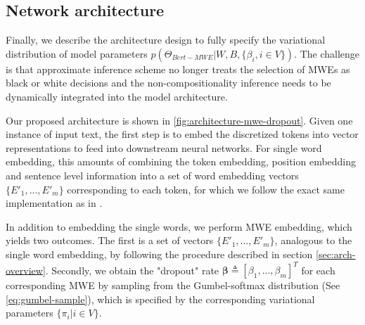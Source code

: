 \subsection{Network architecture}
Finally, we describe the architecture design to fully specify the  variational distribution of model parameters $p(\Theta_{Bert-MWE} \vert W, B, \{\beta_i, i \in V\})$. 
The challenge is that approximate inference scheme no longer treats the selection of MWEs as black or white decisions and the non-compositionality inference needs to be dynamically integrated into the model architecture. 




Our proposed architecture is shown in \autoref{fig:architecture-mwe-dropout}. 
Given one instance of input text, the first step is to embed the discretized tokens into vector representations to feed into downstream neural networks.
For single word embedding, this amounts of combining the token embedding, position embedding and sentence level information into 
a set of word embedding vectors $\{E'_1, ..., E'_m\}$ corresponding to each token, for which we follow the exact same implementation as in \cite{devlin2018bert}.

In addition to embedding the single words, 
we perform MWE embedding, which yields two outcomes.
The first is a set of vectors $\{E'_1, ..., E'_m\}$, analogous to the single word embedding, 
by following the procedure described in section \autoref{sec:arch-overview}. 
Secondly, we obtain the "dropout" rate $\bm{\beta} \triangleq [\beta_1, ..., \beta_m]^T$ for each corresponding MWE 
by sampling from the Gumbel-softmax distribution (See \autoref{eq:gumbel-sample}), which is specified by the corresponding variational parameters $\{\pi_i \vert i \in V\}$.



